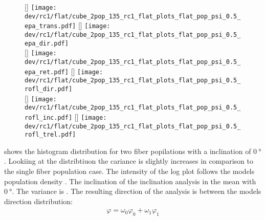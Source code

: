 % 
\begin{figure}[!p]
\centering
\setlength{\width}{0.45\textwidth}
[\width]{
\texttt{[image: dev/rc1/flat/cube\_2pop\_135\_rc1\_flat\_plots\_flat\_pop\_psi\_0.5\_epa\_trans.pdf]}}\hfill
{}[\width]{
\texttt{[image: dev/rc1/flat/cube\_2pop\_135\_rc1\_flat\_plots\_flat\_pop\_psi\_0.5\_epa\_dir.pdf]}}
\\[2em]
[\width]{
\texttt{[image: dev/rc1/flat/cube\_2pop\_135\_rc1\_flat\_plots\_flat\_pop\_psi\_0.5\_epa\_ret.pdf]}}\hfill
{}[\width]{
\texttt{[image: dev/rc1/flat/cube\_2pop\_135\_rc1\_flat\_plots\_flat\_pop\_psi\_0.5\_rofl\_dir.pdf]}}
\\[2em]
[\width]{
\texttt{[image: dev/rc1/flat/cube\_2pop\_135\_rc1\_flat\_plots\_flat\_pop\_psi\_0.5\_rofl\_inc.pdf]}}\hfill
{}[\width]{
\texttt{[image: dev/rc1/flat/cube\_2pop\_135\_rc1\_flat\_plots\_flat\_pop\_psi\_0.5\_rofl\_trel.pdf]}}
\caption[]{\dummy[flat population psi=0.5 rofl analysis; colors left to right: 0 to 90 degree inclination; line: theoretical curve]{}}
\label{fig:flat_05_fiber_pop_rofl}
\end{figure}
% 
 shows the histogram distribution for two fiber popilations with a inclination of $\SI{0}{\degree}$.
Lookiing at the distribtiuon the cariance is slightly increases in comparison to the single fiber population case.
The intensity of the log plot follows the models population density \modelPsi{} .
The inclination of the inclination analysis in the mean with $\SI{0}{\degree}$.
The variance is \dummy{}.
The resulting direction of the analysis is between the models direction distribution:
\begin{align}
    \varphi = \omega_0 \varphi_0 + \omega_1 \varphi_1
\end{align}
% 
% 
% 
